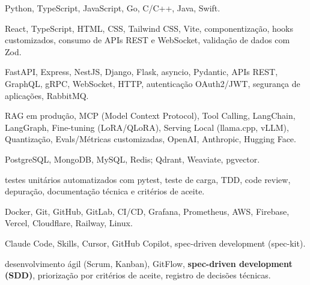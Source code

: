 

  {Python, TypeScript, JavaScript, Go, C/C++, Java, Swift.}

  {React, TypeScript, HTML, CSS, Tailwind CSS, Vite, componentização, hooks
   customizados, consumo de APIs REST e WebSocket, validação de dados com Zod.}

  {FastAPI, Express, NestJS, Django, Flask, asyncio, Pydantic, APIs REST,
   GraphQL, gRPC, WebSocket, HTTP, autenticação OAuth2/JWT, segurança de
   aplicações, RabbitMQ.}

  {RAG em produção, MCP (Model Context Protocol), Tool Calling, LangChain,
   LangGraph, Fine-tuning (LoRA/QLoRA), Serving Local (llama.cpp, vLLM),
   Quantização, Evals/Métricas customizadas, OpenAI, Anthropic, Hugging Face.}

  {PostgreSQL, MongoDB, MySQL, Redis; Qdrant, Weaviate, pgvector.}

  {testes unitários automatizados com pytest, teste de carga, TDD, code
   review, depuração, documentação técnica e critérios de aceite.}

  {Docker, Git, GitHub, GitLab, CI/CD, Grafana, Prometheus, AWS, Firebase,
   Vercel, Cloudflare, Railway, Linux.}

  {Claude Code, Skills, Cursor, GitHub Copilot, spec-driven development
   (spec-kit).}

  {desenvolvimento ágil (Scrum, Kanban), GitFlow, \textbf{spec-driven
   development (SDD)}, priorização por critérios de aceite, registro de
   decisões técnicas.}

